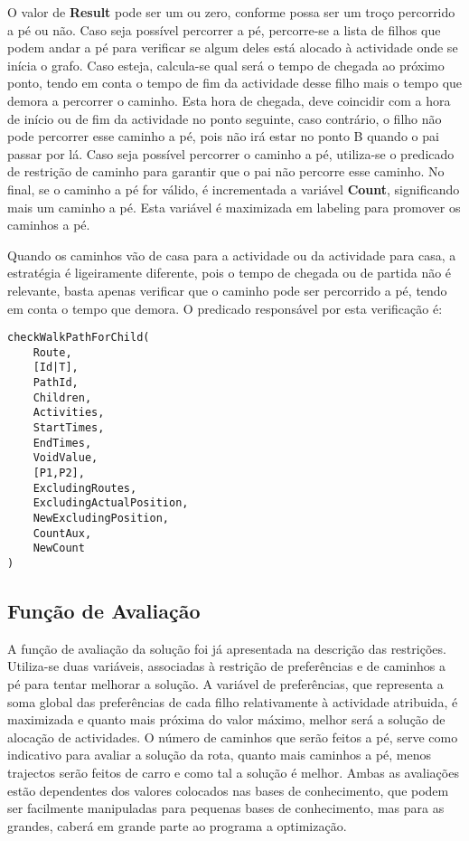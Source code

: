 \documentclass[runningheads]{llncs}
\begin{document}
O valor de \textbf{Result} pode ser um ou zero, conforme possa ser um troço percorrido a pé ou não. Caso seja possível percorrer a pé, percorre-se a lista de filhos que podem andar a pé para verificar se algum deles está alocado à actividade onde se inícia o grafo. Caso esteja, calcula-se qual será o tempo de chegada ao próximo ponto, tendo em conta o tempo de fim da actividade desse filho mais o tempo que demora a percorrer o caminho. Esta hora de chegada, deve coincidir com a hora de início ou de fim da actividade no ponto seguinte, caso contrário, o filho não pode percorrer esse caminho a pé, pois não irá estar no ponto B quando o pai passar por lá. Caso seja possível percorrer o caminho a pé, utiliza-se o predicado de restrição de caminho para garantir que o pai não percorre esse caminho. No final, se o caminho a pé for válido, é incrementada a variável \textbf{Count}, significando mais um caminho a pé. Esta variável é maximizada em labeling para promover os caminhos a pé.

Quando os caminhos vão de casa para a actividade ou da actividade para casa, a estratégia é ligeiramente diferente, pois o tempo de chegada ou de partida não é relevante, basta apenas verificar que o caminho pode ser percorrido a pé, tendo em conta o tempo que demora. O predicado responsável por esta verificação é:

\begin{lstlisting}
checkWalkPathForChild(
	Route,
	[Id|T],
	PathId,
	Children,
	Activities,
	StartTimes,
	EndTimes,
	VoidValue,
	[P1,P2],
	ExcludingRoutes,
	ExcludingActualPosition,
	NewExcludingPosition,
	CountAux,
	NewCount
)
\end{lstlisting}

\subsection{Função de Avaliação}

A função de avaliação da solução foi já apresentada na descrição das restrições. Utiliza-se duas variáveis, associadas à restrição de preferências e de caminhos a pé para tentar melhorar a solução. A variável de preferências, que representa a soma global das preferências de cada filho relativamente à actividade atribuida, é maximizada e quanto mais próxima do valor máximo, melhor será a solução de alocação de actividades. O número de caminhos que serão feitos a pé, serve como indicativo para avaliar a solução da rota, quanto mais caminhos a pé, menos trajectos serão feitos de carro e como tal a solução é melhor. Ambas as avaliações estão dependentes dos valores colocados nas bases de conhecimento, que podem ser facilmente manipuladas para pequenas bases de conhecimento, mas para as grandes, caberá em grande parte ao programa a optimização.
\end{document}
